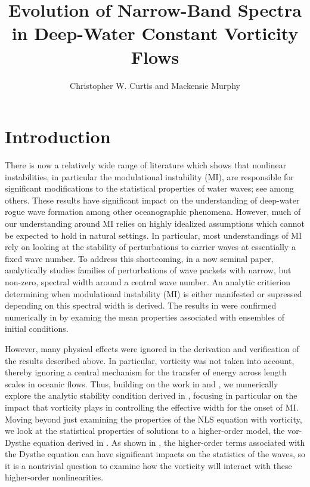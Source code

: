 \documentclass[a4paper,11pt]{article}
\title{Evolution of Narrow-Band Spectra in Deep-Water Constant Vorticity Flows}
\author{Christopher W. Curtis and Mackensie Murphy}
\date{}
\begin{document}
\maketitle
\section*{Introduction}
There is now a relatively wide range of literature which shows that nonlinear instabilities, in particular the modulational instability (MI), are responsible for significant modifications to the statistical properties of water waves; see \cite{dysthe2,dysthe3,onorato,thomas2012nonlinear} among others.   These results have significant impact on the understanding of deep-water rogue wave formation among other oceanographic phenomena.  However, much of our understanding around MI relies on highly idealized assumptions which cannot be expected to hold in natural settings.  In particular, most understandings of MI rely on looking at the stability of perturbations to carrier waves at essentially a fixed wave number.  To address this shortcoming, in a now seminal paper, \cite{alber} analytically studies families of perturbations of wave packets with narrow, but non-zero, spectral width around a central wave number.  An analytic critierion determining when modulational instability (MI) is either manifested or supressed depending on this spectral width is derived.  The results in \cite{alber} were confirmed numerically in \cite{dysthe2,dysthe3} by examing the mean properties associated with ensembles of initial conditions.  

However, many physical effects were ignored in the derivation and verification of the results described above. In particular, vorticity was not taken into account, thereby ignoring a central mechanism for the transfer of energy across length scales in oceanic flows.  Thus, building on the work in \cite{thomas2012nonlinear} and \cite{curtis8}, we numerically explore the analytic stability condition derived in \cite{alber}, focusing in particular on the impact that vorticity plays in controlling the effective width for the onset of MI.  Moving beyond just examining the properties of the NLS equation with vorticity, we look at the statistical properties of solutions to a higher-order model, the vor-Dysthe equation derived in \cite{curtis8}.  As shown in \cite{onorato}, the higher-order terms associated with the Dysthe equation can have significant impacts on the statistics of the waves, so it is a nontrivial question to examine how the vorticity will interact with these higher-order nonlinearities.  
\end{document}
